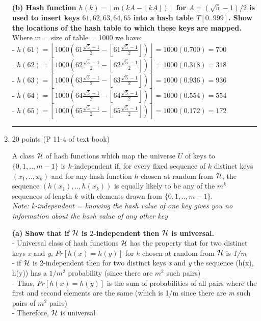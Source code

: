 \documentclass[letterpaper,12pt]{article}
\newcommand{\floor}[1]{\left\lfloor{#1}\right\rfloor}
\begin{document}
\begin{enumerate}
\textbf{(b) Hash function $h(k)=\floor{m(kA-\floor{kA})}$ for $A=(\sqrt{5}-1)/2$ is used to 
insert keys $61,62,63,64,65$ into a hash table $T[0..999]$. Show the locations of 
the hash table to which these keys are mapped.} \\
Where m = size of table = 1000 we have: \\
- \(h(61) = \floor{1000(61\frac{\sqrt{5}-1}{2} - \floor{61\frac{\sqrt{5}-1}{2}})} = 1000(0.700) = 700\) \\
- \(h(62) = \floor{1000(62\frac{\sqrt{5}-1}{2} - \floor{62\frac{\sqrt{5}-1}{2}})} = 1000(0.318) = 318\) \\
- \(h(63) = \floor{1000(63\frac{\sqrt{5}-1}{2} - \floor{63\frac{\sqrt{5}-1}{2}})} = 1000(0.936) = 936\) \\
- \(h(64) = \floor{1000(64\frac{\sqrt{5}-1}{2} - \floor{64\frac{\sqrt{5}-1}{2}})} = 1000(0.554) = 554\) \\
- \(h(65) = \floor{1000(65\frac{\sqrt{5}-1}{2} - \floor{65\frac{\sqrt{5}-1}{2}})} = 1000(0.172) = 172\) \\

\noindent\rule{16cm}{0.1pt}
\item 20 points (P 11-4 of text book)

A class ${\cal H}$ of hash functions which map the universe $U$ of keys to 
$\{0,1,..,m-1\}$ is $k$-independent if, for every fixed sequence of $k$ distinct
keys $(x_1,..,x_k)$ and for any hash function $h$ chosen at random from ${\cal H}$,
the sequence $(h(x_1),..,h(x_k))$ is equally likely to be any of the $m^k$ 
sequences of length $k$ with elements drawn from $\{0,1,..,m-1\}$. \\
\textit{Note: k-independent = knowing the hash value of one key gives you no information about the hash value of any other key}

\textbf{(a) Show that if ${\cal H}$ is $2$-independent then ${\cal H}$ is universal.} \\
- Universal class of hash functions ${\cal H}$ has the property that for two distinct keys \textit{x} and \textit{y}, \(Pr[h(x)=h(y)]\) for \textit{h} chosen at random from ${\cal H}$ is \textit{1/m} \\
- if ${\cal H}$ is 2-independent then for two distinct keys \textit{x} and \textit{y} the sequence (h(x), h(y)) has a \(1/m^2\) probability (since there are $m^2$ such pairs) \\
- Thus, \(Pr[h(x)=h(y)]\)  is the sum of probabilities of all pairs where the first and second elements are the same (which is 1/m since there are \textit{m} such pairs of $m^2$ pairs) \\
- Therefore, ${\cal H}$ is universal


\end{enumerate}
\end{document}
